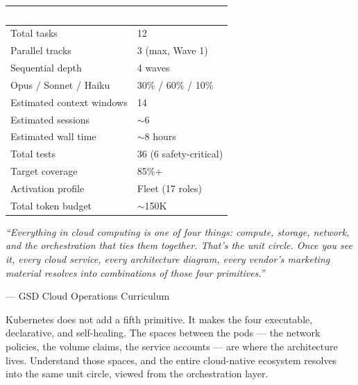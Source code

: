 \documentclass[11pt,letterpaper]{article}
\newcommand{\tableheader}[1]{\textbf{\sffamily\textcolor{white}{#1}}}
\begin{document}
\begin{center}
\begin{tabularx}{\textwidth}{L{4cm}X}
\toprule
{}
\tableheader{Metric} & \tableheader{Value} \\
\midrule
Total tasks & 12 \\
Parallel tracks & 3 (max, Wave 1) \\
Sequential depth & 4 waves \\
Opus / Sonnet / Haiku & 30\% / 60\% / 10\% \\
Estimated context windows & 14 \\
Estimated sessions & $\sim$6 \\
Estimated wall time & $\sim$8 hours \\
Total tests & 36 (6 safety-critical) \\
Target coverage & 85\%+ \\
Activation profile & Fleet (17 roles) \\
Total token budget & $\sim$150K \\
\bottomrule
\end{tabularx}
\end{center}

\vspace{1em}

\begin{quotebox}
\textit{``Everything in cloud computing is one of four things: compute, storage, network, and the orchestration that ties them together. That's the unit circle. Once you see it, every cloud service, every architecture diagram, every vendor's marketing material resolves into combinations of those four primitives.''}

\vspace{0.5em}

--- GSD Cloud Operations Curriculum

\vspace{0.5em}

Kubernetes does not add a fifth primitive. It makes the four executable, declarative, and self-healing. The spaces between the pods --- the network policies, the volume claims, the service accounts --- are where the architecture lives. Understand those spaces, and the entire cloud-native ecosystem resolves into the same unit circle, viewed from the orchestration layer.
\end{quotebox}
\end{document}
